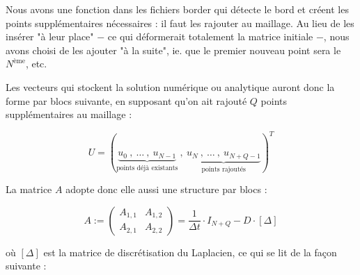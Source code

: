 \documentclass[12pt]{article}
\def \disp {\displaystyle}
\begin{document}
\vspace{5 mm}

\noindent
Nous avons une fonction dans les fichiers border qui détecte le bord et créent les points supplémentaires nécessaires : il faut les rajouter au maillage. Au lieu de les insérer "à leur place" $-$ ce qui déformerait totalement la matrice initiale $-$, nous avons choisi de les ajouter "à la suite", ie. que le premier nouveau point sera le $N^{\text{ème}}$, etc.

\vspace{5 mm}

\noindent
Les vecteurs qui stockent la solution numérique ou analytique auront donc la forme par blocs suivante, en supposant qu'on ait rajouté $Q$ points supplémentaires au maillage :

$$U = \left( \underbrace{u_0~,~\ldots~,~u_{N-1}}_{\disp \text{points déjà existants}}~,~ \underbrace{u_N~,~\ldots~,~u_{N+Q-1}}_{\disp \text{points rajoutés}} \right)^{\disp T}$$

\vspace{5 mm}

\noindent
La matrice $A$ adopte donc elle aussi une structure par blocs :

$$A := \left( \begin{array}{c|c}
A_{1,1} & A_{1,2} \\
\hline
A_{2,1} & A_{2,2}
\end{array} \right) = \frac{1}{\Delta t} \cdot I_{N+Q} - D \cdot [\Delta]
$$

\vspace{5 mm}

\noindent
où $[\Delta]$ est la matrice de discrétisation du Laplacien, ce qui se lit de la façon suivante :

\vspace{5 mm}
\end{document}

